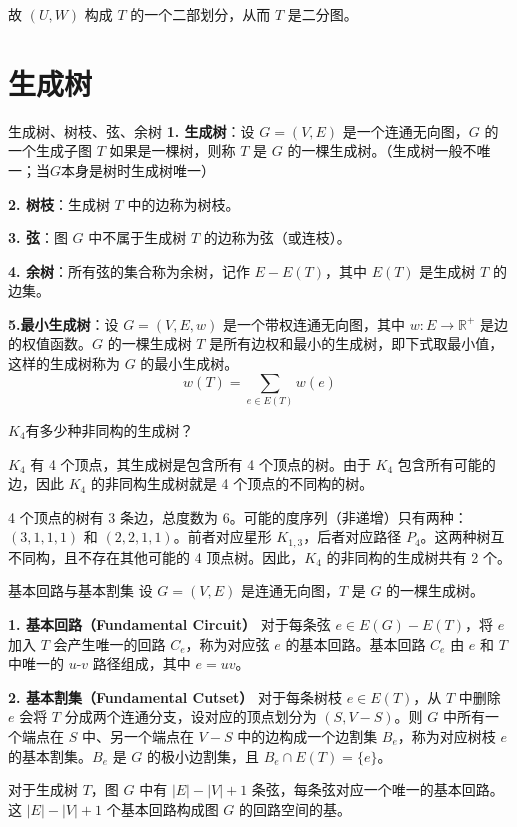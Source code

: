 \documentclass[lang=cn,11pt]{elegantbook}
\begin{document}
故 \((U, W)\) 构成 \(T\) 的一个二部划分，从而 \(T\) 是二分图。
\section{生成树}
\begin{definition}{生成树、树枝、弦、余树}
    \textbf{1. 生成树}：设 $G = (V, E)$ 是一个连通无向图，$G$ 的一个生成子图 $T$ 如果是一棵树，则称 $T$ 是 $G$ 的一棵生成树。（生成树一般不唯一；当$G$本身是树时生成树唯一）

    \textbf{2. 树枝}：生成树 $T$ 中的边称为树枝。

    \textbf{3. 弦}：图 $G$ 中不属于生成树 $T$ 的边称为弦（或连枝）。

    \textbf{4. 余树}：所有弦的集合称为余树，记作 $E - E(T)$，其中 $E(T)$ 是生成树 $T$ 的边集。

    \textbf{5.最小生成树}：设 $G=(V,E,w)$ 是一个带权连通无向图，其中 $w:E \to \mathbb{R}^+$ 是边的权值函数。$G$ 的一棵生成树 $T$ 是所有边权和最小的生成树，即下式取最小值，这样的生成树称为 $G$ 的最小生成树。
    \[
    w(T) = \sum_{e \in E(T)} w(e)
    \]
\end{definition}
\begin{example}
    $K_4$有多少种非同构的生成树？
\end{example}
$K_4$ 有 4 个顶点，其生成树是包含所有 4 个顶点的树。由于 $K_4$ 包含所有可能的边，因此 $K_4$ 的非同构生成树就是 4 个顶点的不同构的树。

4 个顶点的树有 3 条边，总度数为 6。可能的度序列（非递增）只有两种：$(3,1,1,1)$ 和 $(2,2,1,1)$。前者对应星形 $K_{1,3}$，后者对应路径 $P_4$。这两种树互不同构，且不存在其他可能的 4 顶点树。因此，$K_4$ 的非同构的生成树共有 2 个。
\begin{definition}{基本回路与基本割集}
设 $G=(V,E)$ 是连通无向图，$T$ 是 $G$ 的一棵生成树。

\textbf{1. 基本回路（Fundamental Circuit）}
对于每条弦 $e \in E(G)- E(T)$，将 $e$ 加入 $T$ 会产生唯一的回路 $C_e$，称为对应弦 $e$ 的基本回路。基本回路 $C_e$ 由 $e$ 和 $T$ 中唯一的 $u$-$v$ 路径组成，其中 $e=uv$。

\textbf{2. 基本割集（Fundamental Cutset）}
对于每条树枝 $e \in E(T)$，从 $T$ 中删除 $e$ 会将 $T$ 分成两个连通分支，设对应的顶点划分为 $(S, V- S)$。则 $G$ 中所有一个端点在 $S$ 中、另一个端点在 $V-S$ 中的边构成一个边割集 $B_e$，称为对应树枝 $e$ 的基本割集。$B_e$ 是 $G$ 的极小边割集，且 $B_e \cap E(T) = \{e\}$。
\end{definition}
对于生成树 $T$，图 $G$ 中有 $|E|-|V|+1$ 条弦，每条弦对应一个唯一的基本回路。这 $|E|-|V|+1$ 个基本回路构成图 $G$ 的回路空间的基。
\end{document}
